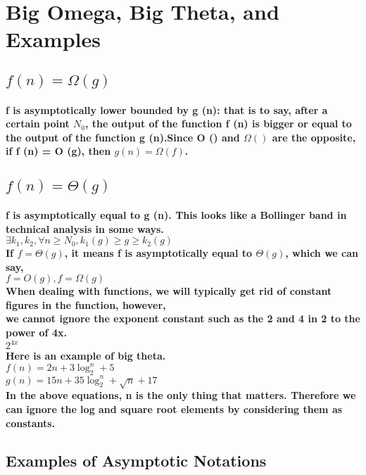 \documentclass{article}
\begin{document}
\section{Big Omega, Big Theta, and Examples}

\subsection{$f(n)=\Omega(g)$}

\paragraph{f is asymptotically lower bounded by g (n): that is to say, after a certain point $N_0$, 
the output of the function f (n) is bigger or equal to the output of the function g (n).Since O () and $\Omega()$ are the opposite, if f (n) = O (g), then $g(n)=\Omega(f)$.}

\subsection{$f(n)=\Theta(g)$}

\paragraph{f is asymptotically equal to g (n). This looks like a Bollinger band in technical analysis in some ways.\\
$\exists k_1,k_2, \forall n \geq N_0,k_1(g) \geq g \geq k_2(g)$\\
If $f = \Theta(g)$, it means f is asymptotically equal to $\Theta(g)$, which we can say,\\
$f = O(g),  f = \Omega(g)$\\
When dealing with functions, we will typically get rid of constant figures in the function, however,\\
we cannot ignore the exponent constant such as the 2 and 4 in 2 to the power of 4x. \\
$2^{4x}$\\
Here is an example of big theta.\\
$f(n)=2n+3\log_2^n+5$\\
$g(n)=15n+35\log_2^n+\sqrt{n}+17$\\
In the above equations, n is the only thing that matters. Therefore we can ignore the log and square root elements by considering them as constants.}

\subsection{Examples of Asymptotic Notations}
\end{document}
